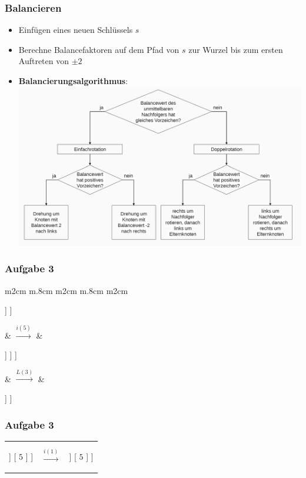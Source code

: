 \documentclass{beamer}
\begin{document}
\begin{frame} \frametitle{Balancieren}
	\begin{itemize}
		\item Einfügen eines neuen Schlüssels $s$
		\item Berechne Balancefaktoren auf dem Pfad von $s$ zur Wurzel bis zum ersten Auftreten von $\pm 2$
		\item \textbf{Balancierungsalgorithmus}: 
		\includegraphics[width=\linewidth]{./tut10_avl.jpg}
	\end{itemize}
\end{frame}

\begin{frame} \frametitle{Aufgabe 3}
	\begin{tabularx}{\linewidth}{m{2cm} m{.8cm} m{2cm} m{.8cm} m{2cm}}
		\begin{forest}
			[ $2$ [ $1$ ] [$3$ [,no edge, draw=none] [ $4$ ]  ] ] 
		\end{forest} 
		&
		$\overset{i(5)}{\longrightarrow}$
		&
		\begin{forest}
			[ $2^2$ [ $1$ ] [ $3^2$ [,no edge, draw=none] [ $4^1$ [,no edge, draw=none] [ $5^0$ ]  ] ]  ]
		\end{forest}  
		&
		$\overset{L(3)}{\longrightarrow}$
		&
		\begin{forest}
			[ $2$ [ $1$ ] [ $4$ [ $3$ ] [ $5$ ] ] ]
		\end{forest}
	\end{tabularx}
\end{frame}

\begin{frame} \frametitle{Aufgabe 3}
	\centering
	\begin{tabularx}{\linewidth}{m{2cm} m{.8cm} m{4cm}}
		\begin{forest}
			[ $4$ [ $2$ [,no edge, draw=none] [ $3$ ]  ] [ $5$ ] ]
		\end{forest}
		&
		$\overset{i(1)}{\longrightarrow}$
		&
		\begin{forest}
			[ $4^{-1}$ [ $2^0$ [ $1^0$ ] [ $3$ ]  ] [ $5$ ] ]
		\end{forest} 
	\end{tabularx}
\end{frame}
\end{document}
